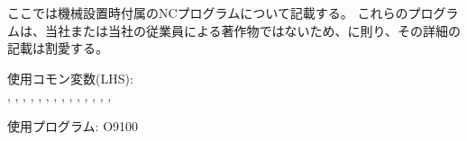 \setcounter{lstlisting}{0}

ここでは機械設置時付属のNCプログラムについて記載する。
これらのプログラムは、当社または当社の従業員による著作物ではないため、に則り、その詳細の記載は割愛する。




\begin{hosoku}\small
使用コモン変数(LHS):\\
, , , , , , , , , , , , , , 
\end{hosoku}


\clearpage

\begin{hosoku}\small
使用プログラム: O9100
\end{hosoku}


